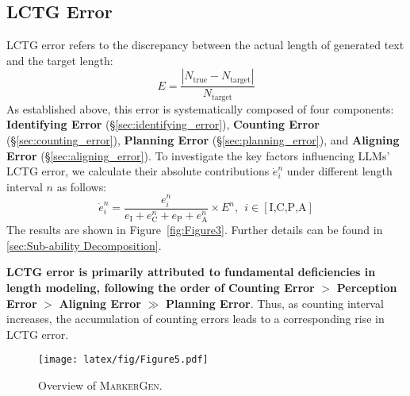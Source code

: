\subsection{LCTG Error}  
LCTG error refers to the discrepancy between the actual length of generated text and the target length:
\begin{equation}
E = \frac{|N_{\mathrm{true}} - N_{\mathrm{target}}|}{N_{\mathrm{target}}} 
\label{eq:E}
\end{equation}
As established above, this error is systematically composed of four components: \textbf{Identifying Error} (\S\ref{sec:identifying_error}), \textbf{Counting Error} (\S\ref{sec:counting_error}), \textbf{Planning Error} (\S\ref{sec:planning_error}), and \textbf{Aligning Error} (\S\ref{sec:aligning_error}). To investigate the key factors influencing LLMs' LCTG error, we calculate their absolute contributions $\dot{e}_i^{n}$ under different length interval \( n \) as follows:  
\begin{equation}
\dot{e}_i^{n} = \frac{e_i^{n}}{e_\text{I} + e_\text{C}^{n} + e_\text{P} + e^n_\text{A}} \times E^{n} ,\ \ i\in[\text{I,C,P,A}]
\label{eq:ei}
\end{equation}
The results are shown in Figure~\ref{fig:Figure3}. Further details can be found in \ref{sec:Sub-ability Decomposition}. 


\begin{finding}
\label{find8}
\textbf{LCTG error is primarily attributed to fundamental deficiencies in length modeling, following the order of}  
 \textbf{Counting Error} $>$ \textbf{Perception Error} $>$ \textbf{Aligning Error} $\gg$ \textbf{Planning Error}.  
Thus, as counting interval increases, the accumulation of counting errors leads to a corresponding rise in LCTG error.
\end{finding}

 \begin{figure*}[t]
    \centering 
\texttt{[image: latex/fig/Figure5.pdf]}
\vspace{-5pt}
  \caption{Overview of \textsc{MarkerGen}.}
    \vspace{-12pt}
  \label{fig:Figure5}
\end{figure*}

